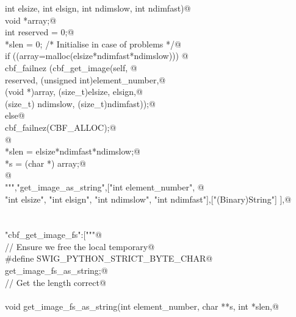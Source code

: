 \documentclass[10pt,a4paper,twoside,notitlepage]{article}
\begin{document}
\begin{flushleft}
\begin{minipage}{\linewidth}
\begin{list}{}{}
\mbox{}\verb@    int elsize, int elsign, int ndimslow, int ndimfast){@\\
\mbox{}\verb@        void *array;@\\
\mbox{}\verb@        int reserved = 0;@\\
\mbox{}\verb@        *slen = 0; /* Initialise in case of problems */@\\
\mbox{}\verb@        if ((array=malloc(elsize*ndimfast*ndimslow))) {@\\
\mbox{}\verb@               cbf_failnez (cbf_get_image(self, @\\
\mbox{}\verb@               reserved, (unsigned int)element_number,@\\
\mbox{}\verb@               (void *)array, (size_t)elsize, elsign,@\\
\mbox{}\verb@               (size_t) ndimslow, (size_t)ndimfast));@\\
\mbox{}\verb@         }else{@\\
\mbox{}\verb@               cbf_failnez(CBF_ALLOC);@\\
\mbox{}\verb@         }@\\
\mbox{}\verb@        *slen = elsize*ndimfast*ndimslow;@\\
\mbox{}\verb@        *s = (char *) array;@\\
\mbox{}\verb@      }@\\
\mbox{}\verb@""","get_image_as_string",["int element_number", @\\
\mbox{}\verb@    "int elsize", "int elsign", "int ndimslow", "int ndimfast"],["(Binary)String"] ],@\\
\mbox{}\verb@@\\
\mbox{}\verb@@\\
\mbox{}\verb@"cbf_get_image_fs":["""@\\
\mbox{}\verb@// Ensure we free the local temporary@\\
\mbox{}\verb@%{@\\
\mbox{}\verb@#define SWIG_PYTHON_STRICT_BYTE_CHAR@\\
\mbox{}\verb@%}@\\
\mbox{}\verb@%cstring_output_allocate_size(char ** s, int *slen, free(*$1))@\\
\mbox{}\verb@       get_image_fs_as_string;@\\
\mbox{}\verb@// Get the length correct@\\
\mbox{}\verb@@\\
\mbox{}\verb@    void get_image_fs_as_string(int element_number, char **s, int *slen,@\\

\end{list}
\end{minipage}
\end{flushleft}
\end{document}
